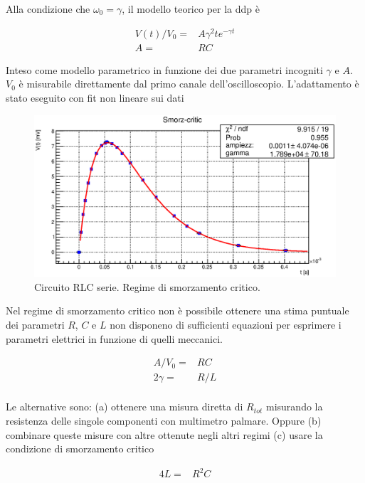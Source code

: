 Alla condizione che $\omega_0 = \gamma$, il modello teorico per la ddp è

\begin{align*}
V(t)/ V_{0} =& A \gamma^{2} t e^{-\gamma t}    \\
A = & RC
\end{align*}

Inteso come modello parametrico in funzione dei due parametri incogniti $\gamma$ e $A$. $V_0$ è misurabile direttamente dal primo canale dell'oscilloscopio. L'adattamento è stato eseguito con fit non lineare sui dati


        

\begin{figure}
\centering
\includegraphics[scale=0.75]{Grafici/C4_P1_Smorz-critic.eps}
\caption{
Circuito RLC serie. Regime di smorzamento critico.
}
\label{fig:C4_P1_critico}
\end{figure}

Nel regime di smorzamento critico non è possibile ottenere una stima puntuale dei parametri $R$, $C$ e $L$ non disponeno di sufficienti equazioni per esprimere i parametri elettrici in funzione di quelli meccanici.

\begin{align*}
    A / V_0 = & RC   \\
    2\gamma    = & R/L   \\
\end{align*}

Le alternative sono: (a) ottenere una misura diretta di $R_{tot}$ misurando la resistenza delle singole componenti con multimetro palmare. Oppure (b) combinare queste misure con altre ottenute negli altri regimi (c) usare la condizione di smorzamento critico

\begin{align*}
    4L = & R^{2}C
\end{align*}

